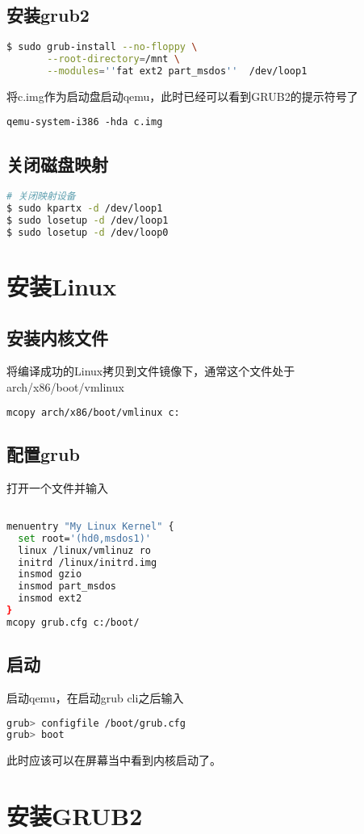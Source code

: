 \subsection{安装grub2}

\begin{lstlisting}[language=bash]
$ sudo grub-install --no-floppy \
       --root-directory=/mnt \
       --modules=''fat ext2 part_msdos''  /dev/loop1
\end{lstlisting}

将c.img作为启动盘启动qemu，此时已经可以看到GRUB2的提示符号了
\begin{lstlisting}
qemu-system-i386 -hda c.img
\end{lstlisting}

\subsection{关闭磁盘映射}
\begin{lstlisting}[language=bash]
# 关闭映射设备
$ sudo kpartx -d /dev/loop1
$ sudo losetup -d /dev/loop1
$ sudo losetup -d /dev/loop0
\end{lstlisting}
\section{安装Linux}
\subsection{安装内核文件}
将编译成功的Linux拷贝到文件镜像下，通常这个文件处于
arch/x86/boot/vmlinux
\begin{lstlisting}[language=bash]
mcopy arch/x86/boot/vmlinux c:
\end{lstlisting}
\subsection{配置grub}
打开一个文件并输入
\begin{lstlisting}[language=bash]

menuentry "My Linux Kernel" {
  set root='(hd0,msdos1)'
  linux /linux/vmlinuz ro
  initrd /linux/initrd.img
  insmod gzio
  insmod part_msdos
  insmod ext2
}
mcopy grub.cfg c:/boot/
\end{lstlisting}


\subsection{启动}
启动qemu，在启动grub cli之后输入
\begin{lstlisting}[language=bash]
grub> configfile /boot/grub.cfg
grub> boot
\end{lstlisting}
此时应该可以在屏幕当中看到内核启动了。
\section{安装GRUB2}
